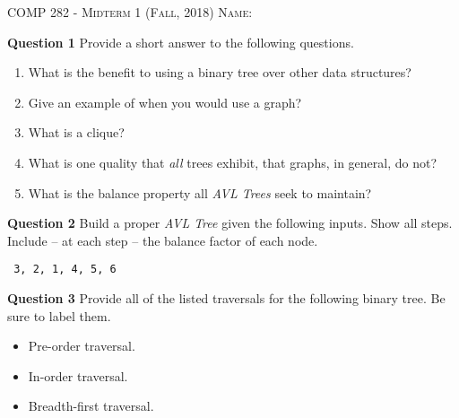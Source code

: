 \documentclass{letter}
\newcommand{\heading}[1]{{\large \textsc{#1}}}
\begin{document}
\heading{COMP 282 - Midterm 1 (Fall, 2018)}
\kern 2cm
\heading{Name:}

{\bf Question 1} \kern 1cm Provide a short answer to the following questions.

\begin{enumerate}[label=(\alph*)]

\item What is the benefit to using a binary tree over other data structures?

\vspace{3cm}

\item Give an example of when you would use a graph?

\vspace{3cm}

\item What is a clique?

\vspace{3cm}

\item What is one quality that {\em all} trees exhibit, that graphs, in
general, do not?

\vspace{3cm}

\item What is the balance property all {\em AVL Trees} seek to maintain?

\end{enumerate}

\clearpage

{\bf Question 2} \kern 1cm Build a proper {\em AVL Tree} given the following
inputs.  Show all steps.  Include -- at each step -- the balance factor of each
node.

\begin{verbatim} 3, 2, 1, 4, 5, 6 \end{verbatim}

\clearpage

{\bf Question 3} \kern 1cm Provide all of the listed traversals for the
following binary tree.  Be sure to label them.

\begin{itemize}
\item Pre-order traversal.
\item In-order traversal.
\item Breadth-first traversal.
\end{itemize}
\end{document}
